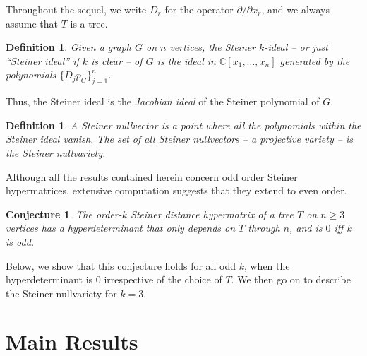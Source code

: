 \documentclass{article}
\newtheorem{definition}[theorem]{Definition}
\newtheorem{conjecture}{Conjecture}
\begin{document}
Throughout the sequel, we write $D_r$ for the operator $\partial / \partial x_r$, and we always assume that $T$ is a tree.

\begin{definition} Given a graph $G$ on $n$ vertices, the {\em Steiner $k$-ideal} -- or just ``Steiner ideal'' if $k$ is clear -- of $G$ is the ideal in $\mathbb{C}[x_1,\ldots,x_n]$ generated by the polynomials $\{D_j p_G \}_{j=1}^n$.
\end{definition}

Thus, the Steiner ideal is the {\em Jacobian ideal} of the Steiner polynomial of $G$.  

\begin{definition} A {\em Steiner nullvector} is a point where all the polynomials within the Steiner ideal vanish. The set of all Steiner nullvectors -- a projective variety -- is the {\em Steiner nullvariety}.
\end{definition}

Although all the results contained herein concern odd order Steiner hypermatrices, extensive computation suggests that they extend to even order.

\begin{conjecture}
    The order-$k$ Steiner distance hypermatrix of a tree $T$ on $n\geq 3$ vertices has a hyperdeterminant that only depends on $T$ through $n$, and is $0$ iff $k$ is odd.
\end{conjecture}

Below, we show that this conjecture holds for all odd $k$, when the hyperdeterminant is $0$ irrespective of the choice of $T$.  We then go on to describe the Steiner nullvariety for $k=3$.

\section{Main Results}
\end{document}
